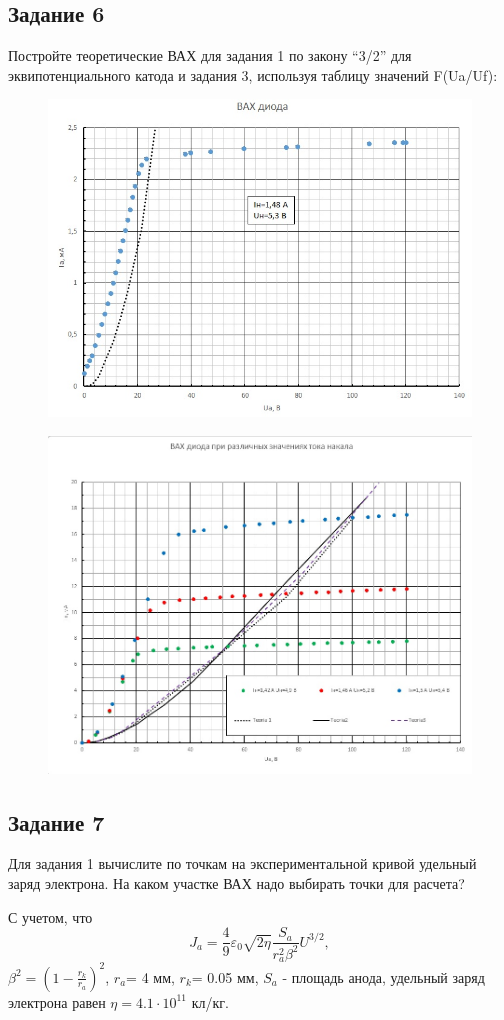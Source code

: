 \subsection{Задание 6}
 Постройте теоретические ВАХ для задания 1 по закону “3/2” для эквипотенциального катода и задания 3, используя таблицу значений F(Ua/Uf):
 \begin{figure}[H]
	\centering
	\includegraphics[width=0.65\linewidth]{fig/z71.jpg}
	\caption{}
	\label{fig:21}
\end{figure}

 \begin{figure}[H]
	\centering
	\includegraphics[width=0.65\linewidth]{fig/z72.jpg}
	\caption{}
	\label{fig:22}
\end{figure}
\subsection{Задание 7}
 Для задания 1 вычислите по точкам на экспериментальной кривой удельный заряд электрона. На каком участке ВАХ надо выбирать точки для расчета?

С учетом, что 
\begin{equation}
J_a=\frac49 \varepsilon_0 \sqrt{2 \eta} \frac{S_a}{r_a^2 \beta^2} U^{3/2}, 
\end{equation}
$\beta^2=(1-\frac{r_k}{r_a})^2$, $r_a$= 4 мм, $r_k$= 0.05 мм, $S_a$ - площадь анода, удельный заряд электрона равен $\eta=4.1 \cdot 10^{11}$ кл/кг.



